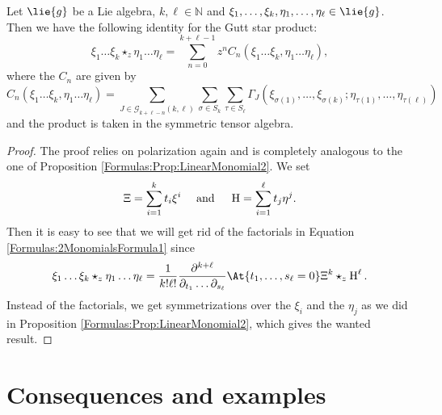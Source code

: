 \begin{proposition}
	\label{Formulas:Prop:2MonomialsFormula2}
	Let $\lie{g}$ be a Lie algebra, $k, \ell \in \mathbb{N}$ and $\xi_1, 
	\ldots, \xi_k, \eta_1, \ldots, \eta_{\ell} \in \lie{g}$. Then we 
	have the following identity for the Gutt star product:
	\begin{equation*}
    		\xi_1 \ldots \xi_k \star_z \eta_1 \ldots \eta_{\ell}
    		=
		\sum\limits_{n=0}^{k + \ell -1}
    		z^n C_n
    		\left( 
    			\xi_1 \ldots \xi_k, \eta_1 \ldots \eta_{\ell}
    		\right),
	\end{equation*}
	where the $C_n$ are given by
	\begin{equation}
		\label{Formulas:2MonomialsFormula2}
        C_n
        \left( 
    			\xi_1 \ldots \xi_k, \eta_1 \ldots \eta_{\ell}
    		\right)
        =
        \sum\limits_{J \in \mathcal{G}_{k + \ell - n}(k, \ell)}
        \sum\limits_{\sigma \in S_k}
        \sum\limits_{\tau \in S_{\ell}}
        \Gamma_J 
        \left(
        		\xi_{\sigma(1)}, \ldots, \xi_{\sigma(k)};
        		\eta_{\tau(1)}, \ldots, \eta_{\tau(\ell)}
        \right)
	\end{equation}
	and the product is taken in the symmetric tensor algebra.
\end{proposition}
\begin{proof}
	The proof relies on polarization again and is completely analogous 
	to the one of Proposition \ref{Formulas:Prop:LinearMonomial2}. We set
	\begin{equation*}
		\Xi
		=
		\sum\limits_{i=1}^k t_i \xi^i
		\quad \text{ and } \quad
		\operatorname{H}
		=
		\sum\limits_{i=1}^{\ell} t_j \eta^j
		.
	\end{equation*}
	Then it is easy to see that we will get rid of the factorials in Equation 
	\eqref{Formulas:2MonomialsFormula1} since
	\begin{equation*}
		\xi_1 \ldots \xi_k \star_z \eta_1 \ldots \eta_{\ell}
		=
		\frac{1}{k! \ell!}
		\frac{\partial^{k + \ell}}
		{\partial_{t_1} \ldots \partial_{s_{\ell}}}
		\At{t_1, \ldots, s_{\ell} = 0}
		\Xi^k \star_z \Eta^{\ell}.
	\end{equation*}
	Instead of the factorials, we get symmetrizations over the 
	$\xi_i$ and the $\eta_j$ as we did in Proposition 
	\ref{Formulas:Prop:LinearMonomial2}, which gives the wanted result.
\end{proof}



\section{Consequences and examples}
\label{sec:chap4_Consequences}

